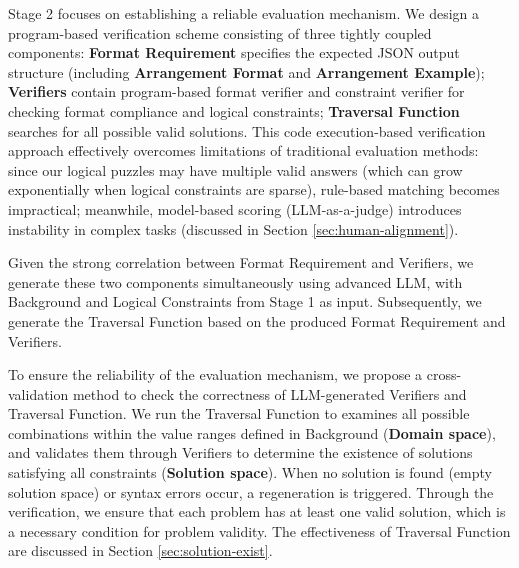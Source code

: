 Stage 2 focuses on establishing a reliable evaluation mechanism. We design a program-based verification scheme consisting of three tightly coupled components: \textbf{Format Requirement} specifies the expected JSON output structure (including \textbf{Arrangement Format} and \textbf{Arrangement Example}); \textbf{Verifiers} contain program-based format verifier and constraint verifier for checking format compliance and logical constraints; \textbf{Traversal Function} searches for all possible valid solutions. This code execution-based verification approach effectively overcomes limitations of traditional evaluation methods:
since our logical puzzles may have multiple valid answers (which can grow exponentially when logical constraints are sparse), rule-based matching becomes impractical; meanwhile, model-based scoring (LLM-as-a-judge) introduces instability in complex tasks (discussed in Section \ref{sec:human-alignment}).

Given the strong correlation between Format Requirement and Verifiers, we generate these two components simultaneously using advanced LLM, with Background and Logical Constraints from Stage 1 as input. Subsequently, we generate the Traversal Function based on the produced Format Requirement and Verifiers.

To ensure the reliability of the evaluation mechanism, we propose a cross-validation method to check the correctness of LLM-generated Verifiers and Traversal Function.
We run the Traversal Function to examines all possible combinations within the value ranges defined in Background (\textbf{Domain space}), and validates them through Verifiers to determine the existence of solutions satisfying all constraints (\textbf{Solution space}). %
When no solution is found (empty solution space) or syntax errors occur, a regeneration is triggered. Through the verification, we ensure that each problem has at least one valid solution, which is a necessary condition for problem validity. The effectiveness of Traversal Function are discussed in Section \ref{sec:solution-exist}. %



